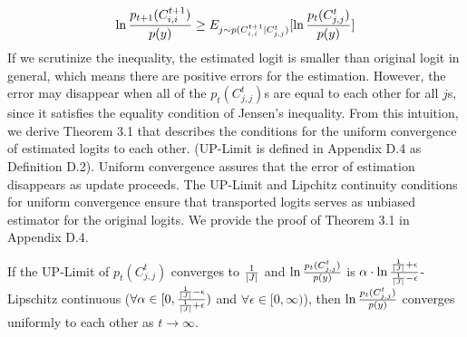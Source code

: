 \begin{align}
\label{estimation_error}
\begin{split}
\ln{p_{t+1}(C^{t+1}_{i,i}) \over p(y)}   \ge E_{j \sim p(C^{t+1}_{i,i}|C^t_{j,j})}[\ln{p_{t}(C^t_{j,j})\over p(y)}]
\end{split}
\end{align}
If we scrutinize the inequality, the estimated logit is smaller than original logit in general, 
which means there are positive errors for the estimation.
However, the error may disappear when all of the $p_t(C^t_{j,j})$s are equal to each other for all $j$s, 
since it satisfies the equality condition of Jensen’s inequality.
From this intuition, we derive Theorem 3.1 that describes the conditions for the uniform convergence of estimated logits to each other.
(UP-Limit is defined in Appendix D.4 as Definition D.2).
Uniform convergence assures that the error of estimation disappears as update proceeds.
The UP-Limit and Lipchitz continuity conditions for uniform convergence 
ensure that transported logits serves as unbiased estimator for the original logits.
We provide the proof of Theorem 3.1 in Appendix D.4. 
\begin{theorem}
\label{thm:uniform_convergence}
If the UP-Limit of $p_t(C^t_{j,j})$ converges to ${1 \over |J|}$ and 
$\ln {p_t(C^t_{j,j}) \over p(y)}$ is 
$\alpha\cdot\ln{{1 \over |J|} +\epsilon \over {1 \over |J|}-\epsilon}$-Lipschitz continuous 
($\forall \alpha \in [0,{{1 \over |J|} -\epsilon \over {1 \over |J|} +\epsilon})$ 
and $\forall \epsilon \in [0,\infty)$), 
then $\ln {p_t(C^t_{j,j}) \over p(y)}$ converges uniformly to each other as $t \rightarrow \infty$.
\end{theorem}
 
